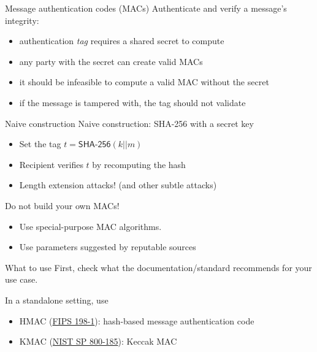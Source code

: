 \begin{frame}{Message authentication codes (MACs)}
  Authenticate and verify a message's integrity:
  \begin{itemize}[<+(1)->]
    \item authentication \emph{tag} requires a shared secret to compute
    \item any party with the secret can create valid MACs
    \item it should be infeasible to compute a valid MAC without the secret
    \item if the message is tampered with, the tag should not validate
  \end{itemize}
\end{frame}

\begin{frame}{Naive construction}
  Naive construction: SHA-256 with a secret key
  \begin{itemize}[<+(1)->]
    \item Set the tag $t = \mathsf{SHA\text{-}256}(k||m)$
    \item Recipient verifies $t$ by recomputing the hash
    \item Length extension attacks! (and other subtle attacks)
  \end{itemize}

  \vspace*{1em}

  \pause
  Do not build your own MACs!
  \begin{itemize}[<+(1)->]
    \item Use special-purpose MAC algorithms.
    \item Use parameters suggested by reputable sources
  \end{itemize}
\end{frame}

\begin{frame}{What to use}
  First, check what the documentation/standard recommends for your use case.

  \vspace*{1em}

  \pause
  In a standalone setting, use
  \begin{itemize}[<+(1)->]
    \item HMAC (\href{https://csrc.nist.gov/pubs/fips/198-1/final}{FIPS 198-1}): hash-based message authentication code
    \item KMAC (\href{https://csrc.nist.gov/pubs/sp/800/185/final}{NIST SP 800-185}): Keccak MAC
  \end{itemize}
\end{frame}

